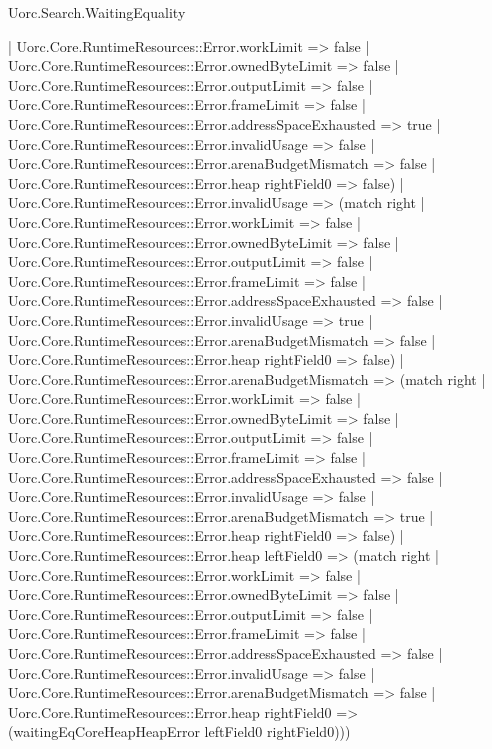 \begin{lexlean}{Uorc.Search.WaitingEquality}
\begin{semanticmodule}
{      | Uorc.Core.RuntimeResources::Error.workLimit => false
      | Uorc.Core.RuntimeResources::Error.ownedByteLimit => false
      | Uorc.Core.RuntimeResources::Error.outputLimit => false
      | Uorc.Core.RuntimeResources::Error.frameLimit => false
      | Uorc.Core.RuntimeResources::Error.addressSpaceExhausted => true
      | Uorc.Core.RuntimeResources::Error.invalidUsage => false
      | Uorc.Core.RuntimeResources::Error.arenaBudgetMismatch => false
      | Uorc.Core.RuntimeResources::Error.heap rightField0 => false)
    | Uorc.Core.RuntimeResources::Error.invalidUsage => (match right
      | Uorc.Core.RuntimeResources::Error.workLimit => false
      | Uorc.Core.RuntimeResources::Error.ownedByteLimit => false
      | Uorc.Core.RuntimeResources::Error.outputLimit => false
      | Uorc.Core.RuntimeResources::Error.frameLimit => false
      | Uorc.Core.RuntimeResources::Error.addressSpaceExhausted => false
      | Uorc.Core.RuntimeResources::Error.invalidUsage => true
      | Uorc.Core.RuntimeResources::Error.arenaBudgetMismatch => false
      | Uorc.Core.RuntimeResources::Error.heap rightField0 => false)
    | Uorc.Core.RuntimeResources::Error.arenaBudgetMismatch => (match right
      | Uorc.Core.RuntimeResources::Error.workLimit => false
      | Uorc.Core.RuntimeResources::Error.ownedByteLimit => false
      | Uorc.Core.RuntimeResources::Error.outputLimit => false
      | Uorc.Core.RuntimeResources::Error.frameLimit => false
      | Uorc.Core.RuntimeResources::Error.addressSpaceExhausted => false
      | Uorc.Core.RuntimeResources::Error.invalidUsage => false
      | Uorc.Core.RuntimeResources::Error.arenaBudgetMismatch => true
      | Uorc.Core.RuntimeResources::Error.heap rightField0 => false)
    | Uorc.Core.RuntimeResources::Error.heap leftField0 => (match right
      | Uorc.Core.RuntimeResources::Error.workLimit => false
      | Uorc.Core.RuntimeResources::Error.ownedByteLimit => false
      | Uorc.Core.RuntimeResources::Error.outputLimit => false
      | Uorc.Core.RuntimeResources::Error.frameLimit => false
      | Uorc.Core.RuntimeResources::Error.addressSpaceExhausted => false
      | Uorc.Core.RuntimeResources::Error.invalidUsage => false
      | Uorc.Core.RuntimeResources::Error.arenaBudgetMismatch => false
      | Uorc.Core.RuntimeResources::Error.heap rightField0 => (waitingEqCoreHeapHeapError leftField0 rightField0)))
}


\end{semanticmodule}
\end{lexlean}
